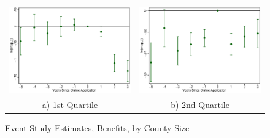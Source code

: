 \documentclass[11pt,letterpaper]{article}
\begin{document}
\begin{figure}\caption{Event Study Estimates, Benefits, by County Size}
\begin{tabular}{cc}
\includegraphics[scale=0.57]{tabfig/evstu_size1_snap_t_one_yrcfcttr_5_3}&\includegraphics[scale=0.57]{tabfig/evstu_size2_snap_t_one_yrcfcttr_5_3}\\
a) 1st Quartile&b) 2nd Quartile\\

\end{tabular}
\end{figure}
\end{document}
